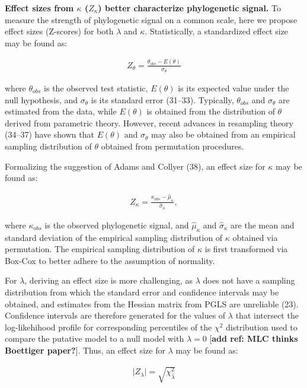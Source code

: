 \documentclass[9pt,twocolumn,twoside,lineno]{pnas-new}
\begin{document}
\textbf{Effect sizes from \(\kappa\) (\(Z_{\kappa}\)) better
characterize phylogenetic signal.} To measure the strength of
phylogenetic signal on a common scale, here we propose effect sizes
(Z-scores) for both \(\lambda\) and \(\kappa\). Statistically, a
standardized effect size may be found as:

\begin{align}
    Z_{\theta}=\frac{\theta_{obs}-E(\theta)}{\sigma_\theta}
\end{align}

where \(\theta_{obs}\) is the observed test statistic, \(E(\theta)\) is
its expected value under the null hypothesis, and \(\sigma_\theta\) is
its standard error (31--33). Typically, \(\theta_{obs}\) and
\(\sigma_\theta\) are estimated from the data, while \(E(\theta)\) is
obtained from the distribution of \(\theta\) derived from parametric
theory. However, recent advances in resampling theory (34--37) have
shown that \(E(\theta)\) and \(\sigma_\theta\) may also be obtained from
an empirical sampling distribution of \(\theta\) obtained from
permutation procedures.

Formalizing the suggestion of Adams and Collyer (38), an effect size for
\(\kappa\) may be found as:

\begin{align}
    Z_\kappa=\frac{\kappa_{obs}-\hat\mu_{\kappa}}{\hat\sigma_{\kappa}},
\end{align}

where \(\kappa_{obs}\) is the observed phylogenetic signal, and
\(\hat\mu_\kappa\) and \(\hat\sigma_\kappa\) are the mean and standard
deviation of the empirical sampling distribution of \(\kappa\) obtained
via permutation. The empirical sampling distribution of \(\kappa\) is
first transformed via Box-Cox to better adhere to the assumption of
normality.

For \(\lambda\), deriving an effect size is more challenging, as
\(\lambda\) does not have a sampling distribution from which the
standard error and confidence intervals may be obtained, and estimates
from the Hessian matrix from PGLS are unreliable (23). Confidence
intervals are therefore generated for the values of \(\lambda\) that
intersect the log-likehihood profile for corresponding percentiles of
the \(\chi^2\) distribution used to compare the putative model to a null
model with \(\lambda = 0\) {[}\textbf{add ref: MLC thinks Boettiger
paper?}{]}. Thus, an effect size for \(\lambda\) may be found as:

\begin{align}
   \lvert Z_{\lambda} \rvert = \sqrt{\chi^2_{\hat{\lambda}}}
\end{align}
\end{document}
